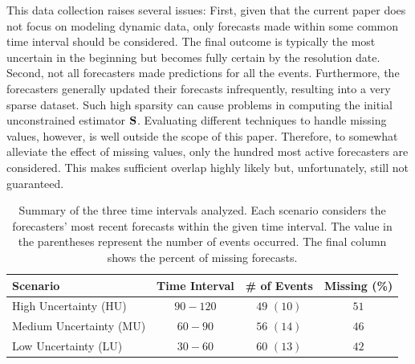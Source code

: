 \documentclass[11pt]{article}
\theoremstyle{definition}
\theoremstyle{definition}
\def\SS{{\bf S}}
\begin{document}

This data collection raises several issues: First, given that the current paper does not focus on modeling dynamic data, only forecasts made within some common time interval should be considered.  The final outcome is typically the most uncertain in the beginning but becomes fully certain by the resolution date. 
 Second, not all forecasters made predictions for all the events. Furthermore, the forecasters generally updated their forecasts infrequently, resulting into a very sparse dataset. Such high sparsity can cause problems in  computing the initial unconstrained estimator $\SS$. 
Evaluating different techniques to handle missing values, however, is well outside the scope of this paper. Therefore, to somewhat alleviate the effect of missing values, only the hundred most active forecasters are considered. This makes sufficient overlap highly likely but, unfortunately, still not guaranteed. 


\begin{table}[t!]
   \centering
   \caption{Summary of the three time intervals analyzed. Each scenario considers the forecasters' most recent forecasts within the given time interval. The value in the parentheses represent the number of events occurred. The final column shows the percent of missing forecasts. }
   \begin{tabular}{l ccc } %
   \hline\hline
      Scenario      & Time Interval & \# of Events & Missing (\%)  \\\hline
      High Uncertainty (HU)        & $90-120$     & $49$ $(10)$ & $51$\\ 
      Medium Uncertainty (MU)       & $60-90$  &  $56$ $(14)$  & $46$ \\
      Low Uncertainty (LU) &  $30-60$ & $60$ $(13)$ & $42$\\ \hline
   \end{tabular}
   \label{scenarios}
\end{table}
\end{document}
